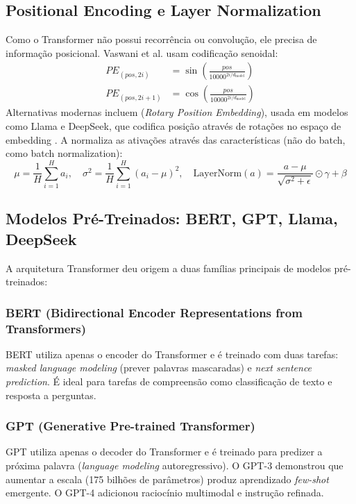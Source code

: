 \subsection{Positional Encoding e Layer Normalization}
Como o Transformer não possui recorrência ou convolução, ele precisa de
informação posicional. Vaswani et al. \cite{vaswani2017attention} usam
codificação senoidal:
\begin{align*}
PE_{(pos, 2i)} &= \sin\left(\frac{pos}{10000^{2i/d_{\text{model}}}}\right) \\
PE_{(pos, 2i+1)} &= \cos\left(\frac{pos}{10000^{2i/d_{\text{model}}}}\right)
\end{align*}
Alternativas modernas incluem  (\textit{Rotary Position
Embedding}), usada em modelos como Llama e DeepSeek, que codifica posição
através de rotações no espaço de embedding \cite{su2024roformer}.
A  \cite{ba2016layer} normaliza as ativações
através das características (não do batch, como batch normalization):
\[\mu = \frac{1}{H} \sum_{i=1}^H a_i, \quad
\sigma^2 = \frac{1}{H} \sum_{i=1}^H (a_i - \mu)^2, \quad
\text{LayerNorm}(a) = \frac{a - \mu}{\sqrt{\sigma^2 + \epsilon}} \odot \gamma + \beta
\]
\subsection{Modelos Pré-Treinados: BERT, GPT, Llama, DeepSeek}
A arquitetura Transformer deu origem a duas famílias principais de modelos
pré-treinados:
\subsubsection*{BERT (Bidirectional Encoder Representations from Transformers)}
BERT \cite{devlin2019bert} utiliza apenas o encoder do Transformer e é
treinado com duas tarefas: \textit{masked language modeling} (prever
palavras mascaradas) e \textit{next sentence prediction}. É ideal para
tarefas de compreensão como classificação de texto e resposta a perguntas.
\subsubsection*{GPT (Generative Pre-trained Transformer)}
GPT \cite{radford2018gpt} utiliza apenas o decoder do Transformer e é
treinado para predizer a próxima palavra (\textit{language modeling}
autoregressivo). O GPT-3 \cite{brown2020language} demonstrou que aumentar a
escala (175 bilhões de parâmetros) produz aprendizado \textit{few-shot}
emergente. O GPT-4 \cite{achiam2023gpt4} adicionou raciocínio multimodal e
instrução refinada.
